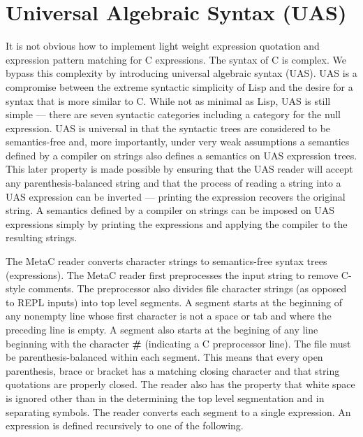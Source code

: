 \documentclass{article}
\begin{document}
\section{Universal Algebraic Syntax (UAS)}

It is not obvious how to implement light weight expression quotation and expression pattern matching for C expressions.  The syntax of C is complex.  We bypass this complexity by introducing universal algebraic syntax (UAS).
UAS is a compromise between the extreme syntactic simplicity of Lisp and the desire for a syntax that is more similar to C.
While not as minimal as Lisp, UAS is still simple --- there are seven syntactic categories including a category for the null expression.
UAS is universal in that the syntactic trees are considered to be semantics-free and, more importantly, under very weak assumptions a semantics defined by a compiler on strings
also defines a semantics on UAS expression trees.
This later property is made possible by ensuring that the UAS reader will accept any parenthesis-balanced string
and that the process of reading a string into a UAS expression can be inverted --- printing the expression recovers the original string.
A semantics defined by a compiler on strings can be imposed on UAS expressions simply by printing the expressions and applying the compiler to the resulting strings.

The MetaC reader converts character strings to semantics-free syntax trees (expressions).
The MetaC reader first preprocesses the input string to remove C-style comments.
The preprocessor also divides file character strings (as opposed to REPL inputs) into top level segments.
A segment starts at the beginning of any nonempty line whose first character is not a space or tab and where the preceding line is empty.
A segment also starts at the begining of any line beginning with the character {\bf \#} (indicating a C preprocessor line).
The file must be parenthesis-balanced within each segment.  This means that every open parenthesis, brace or bracket has a matching closing character and that string quotations
are properly closed.  The reader also has the property that white space is ignored other than in the determining the top level segmentation and in separating symbols.
The reader converts each segment to a single expression.
An expression is defined recursively to one of the following.
\end{document}

